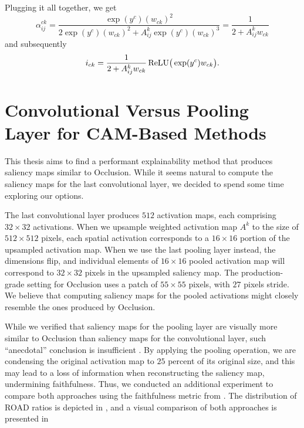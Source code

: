 Plugging it all together, we get 
\begin{equation}
    \alpha_{ij}^{ck} = \frac{\exp(y^c) (w_{ck})^2}{2 \exp(y^c) (w_{ck})^2 + A^k_{ij} \exp(y^c) (w_{ck})^3} = \frac{1}{2 + A^k_{ij}w_{ck}}
\end{equation}
and subsequently
\begin{equation}
    i_{ck} = \frac{1}{2 + A^k_{ij}w_{ck}} \operatorname{ReLU}\bigr(\exp(y^c)w_{ck}\bigl).
\end{equation}

\section*{Convolutional Versus Pooling Layer for CAM-Based Methods}\label{sec:conv-vs-pool}

This thesis aims to find a performant explainability method that produces saliency maps similar to Occlusion.
While it seems natural to compute the saliency maps for the last convolutional layer, we decided to spend some time exploring our options.

The last convolutional layer produces $512$ activation maps, each comprising $32 \times 32$ activations.
When we upsample weighted activation map $A^k$ to the size of $512 \times 512$ pixels, each spatial activation corresponds to a $16 \times 16$ portion of the upsampled activation map.
When we use the last pooling layer instead, the dimensions flip, and individual elements of $16 \times 16$ pooled activation map will correspond to $32 \times 32$ pixels in the upsampled saliency map.
The production-grade setting for Occlusion uses a patch of $55 \times 55$ pixels, with $27$ pixels stride.
We believe that computing saliency maps for the pooled activations might closely resemble the ones produced by Occlusion.

While we verified that saliency maps for the pooling layer are visually more similar to Occlusion than saliency maps for the convolutional layer, such ``anecdotal'' conclusion is insufficient \cite{xai-anecdotal-evidence}.
By applying the pooling operation, we are condensing the original activation map to $25$ percent of its original size, and this may lead to a loss of information when reconstructing the saliency map, undermining faithfulness.
Thus, we conducted an additional experiment to compare both approaches using the faithfulness metric from .
The distribution of ROAD ratios is depicted in , and a visual comparison of both approaches is presented in 

